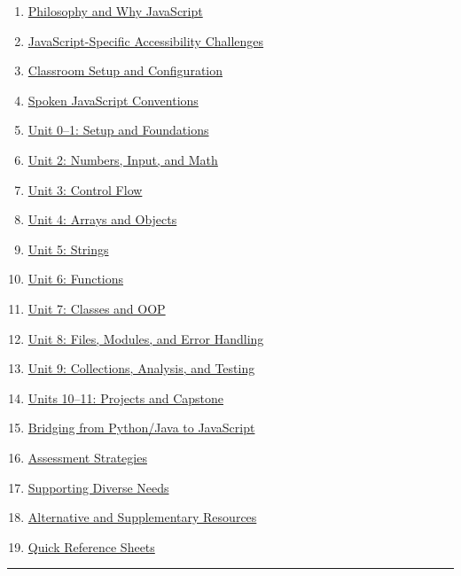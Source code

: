\documentclass[
  justified,
  openright,
]{tufte-book}
\providecommand{\tightlist}{%
  \setlength{\itemsep}{0pt}\setlength{\parskip}{0pt}}
\begin{document}
\begin{enumerate}
\def\labelenumi{\arabic{enumi}.}
\tightlist
\item
  \hyperref[philosophy-and-why-javascript]{Philosophy and Why
  JavaScript}
\item
  \hyperref[javascript-specific-accessibility-challenges]{JavaScript-Specific
  Accessibility Challenges}
\item
  \hyperref[classroom-setup-and-configuration]{Classroom Setup and
  Configuration}
\item
  \hyperref[spoken-javascript-conventions]{Spoken JavaScript
  Conventions}
\item
  \hyperref[unit-01-setup-and-foundations]{Unit 0--1: Setup and
  Foundations}
\item
  \hyperref[unit-2-numbers-input-and-math]{Unit 2: Numbers, Input, and
  Math}
\item
  \hyperref[unit-3-control-flow]{Unit 3: Control Flow}
\item
  \hyperref[unit-4-arrays-and-objects]{Unit 4: Arrays and Objects}
\item
  \hyperref[unit-5-strings]{Unit 5: Strings}
\item
  \hyperref[unit-6-functions]{Unit 6: Functions}
\item
  \hyperref[unit-7-classes-and-oop]{Unit 7: Classes and OOP}
\item
  \hyperref[unit-8-files-modules-and-error-handling]{Unit 8: Files,
  Modules, and Error Handling}
\item
  \hyperref[unit-9-collections-analysis-and-testing]{Unit 9:
  Collections, Analysis, and Testing}
\item
  \hyperref[units-1011-projects-and-capstone]{Units 10--11: Projects and
  Capstone}
\item
  \hyperref[bridging-from-pythonjava-to-javascript]{Bridging from
  Python/Java to JavaScript}
\item
  \hyperref[assessment-strategies]{Assessment Strategies}
\item
  \hyperref[supporting-diverse-needs]{Supporting Diverse Needs}
\item
  \hyperref[alternative-and-supplementary-resources]{Alternative and
  Supplementary Resources}
\item
  \hyperref[quick-reference-sheets]{Quick Reference Sheets}
\end{enumerate}

\begin{center}\rule{0.5\linewidth}{0.5pt}\end{center}
\end{document}
